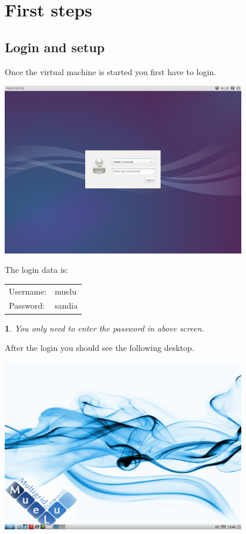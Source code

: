 \documentclass[10pt,fleqn]{book}
\newtheorem*{mycomment}{\ding{42}}
\begin{document}
\section{First steps}

\subsection{Login and setup}

Once the virtual machine is started you first have to login.

\begin{center}\includegraphics[width=0.8\textwidth]{pics/lubuntu_1.png} \end{center}

The login data is:
\begin{center}
\begin{tabular}{ll}
Username: & muelu \\
Password: & sandia
\end{tabular}
\end{center}

\begin{mycomment}
You only need to enter the password in above screen.
\end{mycomment}

After the login you should see the following desktop.
\begin{center}\includegraphics[width=0.8\textwidth]{pics/lubuntu_2.png} \end{center}
\end{document}
